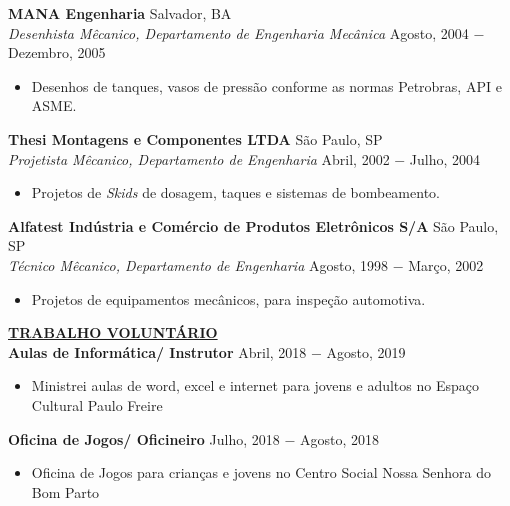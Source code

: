 \documentclass{article}
\begin{document}
\noindent \textbf{MANA Engenharia} \hfill Salvador, BA \\
\textit{Desenhista Mêcanico, Departamento de Engenharia Mecânica} \hfill Agosto, 2004 $-$ Dezembro, 2005
\begin{itemize}[noitemsep,nolistsep,leftmargin=*]
\item {Desenhos de tanques, vasos de pressão conforme as normas Petrobras, API e ASME. \\}
\end{itemize}

\noindent \textbf{Thesi Montagens e Componentes LTDA} \hfill São Paulo, SP \\
\textit{Projetista Mêcanico, Departamento de Engenharia} \hfill Abril, 2002 $-$ Julho, 2004
\begin{itemize}[noitemsep,nolistsep,leftmargin=*]
\item {Projetos de \textit{Skids} de dosagem, taques e sistemas de bombeamento. \\}
\end{itemize}

\noindent \textbf{Alfatest Indústria e Comércio de Produtos Eletrônicos S/A} \hfill São Paulo, SP \\
\textit{Técnico Mêcanico, Departamento de Engenharia} \hfill Agosto, 1998 $-$ Março, 2002
\begin{itemize}[noitemsep,nolistsep,leftmargin=*]
\item {Projetos de equipamentos mecânicos, para inspeção automotiva. \\}
\end{itemize}

\noindent \textbf{\underline{TRABALHO VOLUNTÁRIO}} \\
\noindent \textbf{Aulas de Informática/ Instrutor} \hfill Abril, 2018 $-$ Agosto, 2019
\begin{itemize}[noitemsep,nolistsep,leftmargin=*]
\item {Ministrei aulas de word, excel e internet para jovens e adultos no Espaço Cultural Paulo Freire \\}
\end{itemize}

\noindent \textbf{Oficina de Jogos/ Oficineiro} \hfill Julho, 2018 $-$ Agosto, 2018
\begin{itemize}[noitemsep,nolistsep,leftmargin=*]
\item {Oficina de Jogos para crianças e jovens no Centro Social Nossa Senhora do Bom Parto \\}
\end{itemize}
\end{document}
